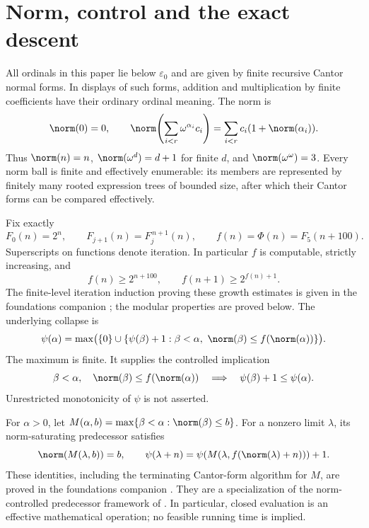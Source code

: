 \documentclass[11pt]{article}
\begin{document}
\section{Norm, control and the exact descent}

All ordinals in this paper lie below $\varepsilon _0$ and are given by
finite recursive Cantor normal forms. In displays of such forms,
addition and multiplication by finite coefficients have their ordinary
ordinal meaning. The norm is
\[
 \norm(0)=0,\qquad
 \norm\!\left(\sum_{i<r}\omega^{\alpha_i}c_i\right)
       =\sum_{i<r}c_i(1+\norm(\alpha_i)).
\]
Thus $\norm(n)=n$, $\norm(\omega^d)=d+1$ for finite $d$, and
$\norm(\omega^\omega)=3$. Every norm ball is finite and effectively
enumerable: its members are represented by finitely many rooted
expression trees of bounded size, after which their Cantor forms can
be compared effectively.

Fix exactly
\begin{equation}\label{eq:control}
 F_0(n)=2^n,\qquad F_{j+1}(n)=F_j^{\,n+1}(n),\qquad
 f(n)=\Phi(n)=F_5(n+100).
\end{equation}
Superscripts on functions denote iteration. In particular $f$ is
computable, strictly increasing, and
\begin{equation}\label{eq:growth}
 f(n)\ge 2^{n+100},\qquad f(n+1)\ge 2^{f(n)+1}.
\end{equation}
The finite-level iteration induction proving these growth estimates is
given in the foundations companion \cite{wwfoundations}; the modular
properties are proved below. The underlying collapse is
\[
 \psi(\alpha)=
 \max\bigl(\{0\}\cup
  \{\psi(\beta)+1:\beta<\alpha,\ \norm(\beta)\le f(\norm(\alpha))\}\bigr).
\]
The maximum is finite. It supplies the controlled implication
\begin{equation}\label{eq:controlled}
 \beta<\alpha,\quad \norm(\beta)\le f(\norm(\alpha))
       \quad\Longrightarrow\quad \psi(\beta)+1\le\psi(\alpha).
\end{equation}
Unrestricted monotonicity of $\psi$ is not asserted.

For $\alpha>0$, let
$M(\alpha,b)=\max\{\beta<\alpha:\norm(\beta)\le b\}$.
For a nonzero limit $\lambda$, its norm-saturating predecessor satisfies
\begin{equation}\label{eq:predecessor}
 \norm(M(\lambda,b))=b,\qquad
 \psi(\lambda+n)=\psi(M(\lambda,f(\norm(\lambda)+n)))+1.
\end{equation}
These identities, including the terminating Cantor-form algorithm for
$M$, are proved in the foundations companion
\cite{wwfoundations}. They are a specialization of the
norm-controlled predecessor framework of \cite{bcw}. In particular,
closed evaluation is an effective mathematical operation; no feasible
running time is implied.
\end{document}
